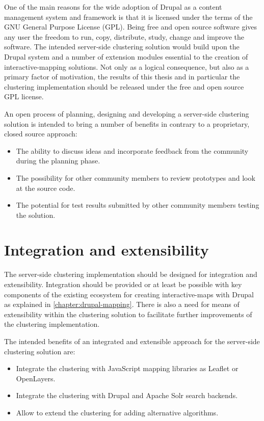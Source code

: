 One of the main reasons for the wide adoption of Drupal as a content management system and framework is that it is licensed under the terms of the GNU General Purpose License (GPL). Being free and open source software gives any user the freedom to run, copy, distribute, study, change and improve the software. The intended server-side clustering solution would build upon the Drupal system and a number of extension modules essential to the creation of interactive-mapping solutions. Not only as a logical consequence, but also as a primary factor of motivation, the results of this thesis and in particular the clustering implementation should be released under the free and open source GPL license.

An open process of planning, designing and developing a server-side clustering solution is intended to bring a number of benefits in contrary to a proprietary, closed source approach:

\begin{itemize}

\item The ability to discuss ideas and incorporate feedback from the community during the planning phase.

\item The possibility for other community members to review prototypes and look at the source code.

\item The potential for test results submitted by other community members testing the solution. 

\end{itemize}


\section{Integration and extensibility}

The server-side clustering implementation should be designed for integration and extensibility. Integration should be provided or at least be possible with key components of the existing ecosystem for creating interactive-maps with Drupal as explained in \ref{chapter:drupal-mapping}. There is also a need for means of extensibility within the clustering solution to facilitate further improvements of the clustering implementation.

The intended benefits of an integrated and extensible approach for the server-side clustering solution are:

\begin{itemize}

\item Integrate the clustering with JavaScript mapping libraries as Leaflet or OpenLayers.

\item Integrate the clustering with Drupal and Apache Solr search backends.

\item Allow to extend the clustering for adding alternative algorithms. 

\end{itemize}


